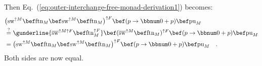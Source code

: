 Then Eq.~(\ref{eq:outer-interchange-free-monad-derivation1}) becomes:
\begin{align*}
 & \big(\text{sw}^{\uparrow M}\bef\text{ftn}_{M}\bef\text{sw}^{\uparrow M}\bef\text{ftn}_{M}\big)^{\uparrow F}\bef(p\rightarrow\bbnum 0+p)\bef\text{pu}_{M}\\
 & \overset{?}{=}\gunderline{\overline{\text{sw}}^{\uparrow M\uparrow F}\bef\text{ftn}_{M}^{\uparrow F}}\bef(\overline{\text{sw}}^{\uparrow M}\bef\text{ftn}_{M})^{\uparrow F}\bef(p\rightarrow\bbnum 0+p)\bef\text{pu}_{M}\\
 & =\big(\text{sw}^{\uparrow M}\bef\text{ftn}_{M}\bef\text{sw}^{\uparrow M}\bef\text{ftn}_{M}\big)^{\uparrow F}\bef(p\rightarrow\bbnum 0+p)\bef\text{pu}_{M}\quad.
\end{align*}
Both sides are now equal.

